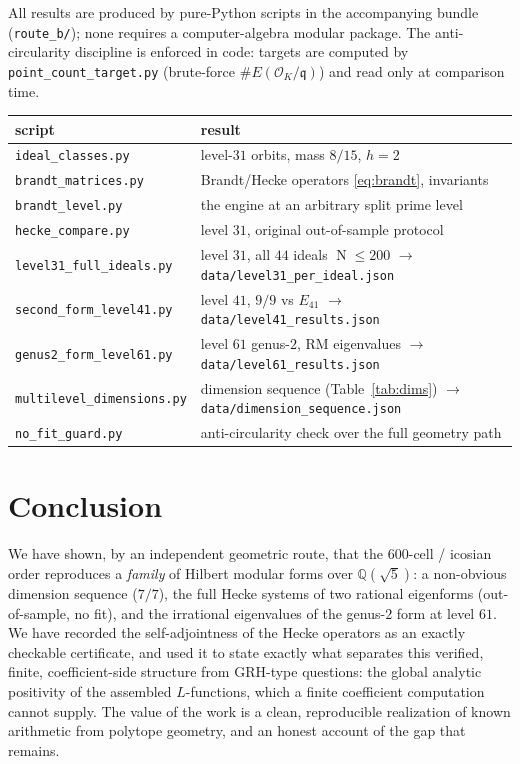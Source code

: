 \documentclass[11pt,a4paper]{article}
\newcommand{\Q}{\mathbb{Q}}
\newcommand{\Ord}{\mathcal{O}}
\newcommand{\fq}{\mathfrak{q}}
\newcommand{\OK}{\Ord_K}
\DeclareMathOperator{\Nm}{N}
\begin{document}
All results are produced by pure-Python scripts in the accompanying
bundle (\texttt{route\_b/}); none requires a computer-algebra modular
package. The anti-circularity discipline is enforced in code: targets
are computed by \texttt{point\_count\_target.py} (brute-force
$\#E(\OK/\fq)$) and read only at comparison time.
\begin{center}
\small
\begin{tabular}{ll}
\toprule
script & result \\
\midrule
\texttt{ideal\_classes.py} & level-$31$ orbits, mass $8/15$, $h=2$ \\
\texttt{brandt\_matrices.py} & Brandt/Hecke operators \eqref{eq:brandt}, invariants \\
\texttt{brandt\_level.py} & the engine at an arbitrary split prime level \\
\texttt{hecke\_compare.py} & level $31$, original out-of-sample protocol \\
\texttt{level31\_full\_ideals.py} & level $31$, all $44$ ideals $\Nm\le200$
  $\to$ \texttt{data/level31\_per\_ideal.json} \\
\texttt{second\_form\_level41.py} & level $41$, $9/9$ vs $E_{41}$
  $\to$ \texttt{data/level41\_results.json} \\
\texttt{genus2\_form\_level61.py} & level $61$ genus-$2$, RM eigenvalues
  $\to$ \texttt{data/level61\_results.json} \\
\texttt{multilevel\_dimensions.py} & dimension sequence (Table~\ref{tab:dims})
  $\to$ \texttt{data/dimension\_sequence.json} \\
\texttt{no\_fit\_guard.py} & anti-circularity check over the full geometry path \\
\bottomrule
\end{tabular}
\end{center}

\section{Conclusion}

We have shown, by an independent geometric route, that the $600$-cell /
icosian order reproduces a \emph{family} of Hilbert modular forms over
$\Q(\sqrt5)$: a non-obvious dimension sequence ($7/7$), the full Hecke
systems of two rational eigenforms (out-of-sample, no fit), and the
irrational eigenvalues of the genus-$2$ form at level $61$. We have
recorded the self-adjointness of the Hecke operators as an exactly
checkable certificate, and used it to state exactly what separates this
verified, finite, coefficient-side structure from GRH-type questions:
the global analytic positivity of the assembled $L$-functions, which a
finite coefficient computation cannot supply. The value of the work is
a clean, reproducible realization of known arithmetic from polytope
geometry, and an honest account of the gap that remains.



\end{document}
